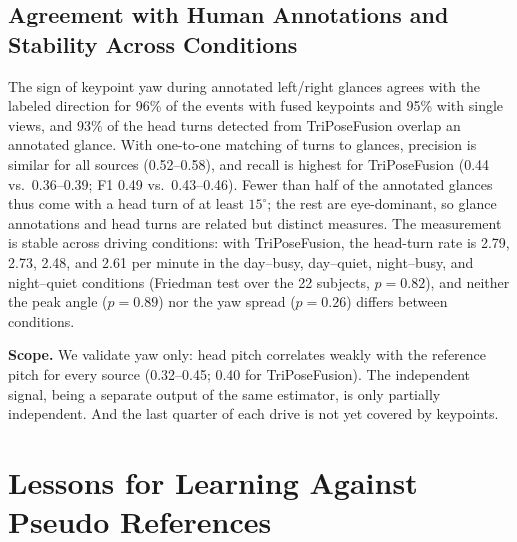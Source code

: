 \documentclass[journal]{IEEEtran}
\newcommand{\method}{TriPoseFusion}
\begin{document}
\subsection{Agreement with Human Annotations and Stability Across Conditions}
The sign of keypoint yaw during annotated left/right glances agrees with the labeled direction for 96\% of the events with fused keypoints and 95\% with single views, and 93\% of the head turns detected from \method{} overlap an annotated glance. With one-to-one matching of turns to glances, precision is similar for all sources (0.52--0.58), and recall is highest for \method{} (0.44 vs.\ 0.36--0.39; F1 0.49 vs.\ 0.43--0.46). Fewer than half of the annotated glances thus come with a head turn of at least $15^\circ$; the rest are eye-dominant, so glance annotations and head turns are related but distinct measures. The measurement is stable across driving conditions: with \method{}, the head-turn rate is 2.79, 2.73, 2.48, and 2.61 per minute in the day--busy, day--quiet, night--busy, and night--quiet conditions (Friedman test over the 22 subjects, $p=0.82$), and neither the peak angle ($p=0.89$) nor the yaw spread ($p=0.26$) differs between conditions.

\textbf{Scope.} We validate yaw only: head pitch correlates weakly with the reference pitch for every source (0.32--0.45; 0.40 for \method{}). The independent signal, being a separate output of the same estimator, is only partially independent. And the last quarter of each drive is not yet covered by keypoints.

\section{Lessons for Learning Against Pseudo References}
\label{sec:lessons}
\end{document}
